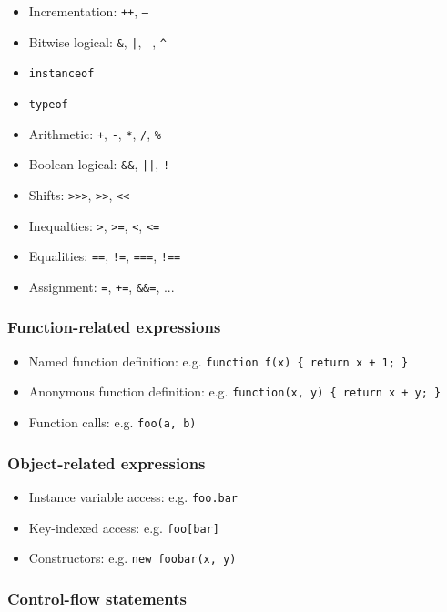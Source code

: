 \documentclass{article}
\begin{document}
\begin{multicols}{2}
\begin{itemize}
  \item Incrementation: \texttt{++}, \texttt{--}
  \item Bitwise logical: \texttt{\&}, \texttt{|}, \texttt{~}, \texttt{\^}
  \item \texttt{instanceof}
  \item \texttt{typeof}
  \item Arithmetic: \texttt{+}, \texttt{-}, \texttt{*}, \texttt{/}, \texttt{\%}
  \item Boolean logical: \texttt{\&\&}, \texttt{||}, \texttt{!}
  \item Shifts: \texttt{>>>}, \texttt{>>}, \texttt{<<}
  \item Inequalties: \texttt{>}, \texttt{>=}, \texttt{<}, \texttt{<=}
  \item Equalities: \texttt{==}, \texttt{!=}, \texttt{===}, \texttt{!==}
  \item Assignment: \texttt{=}, \texttt{+=}, \texttt{\&\&=}, ...
\end{itemize}

\subsubsection*{Function-related expressions}

\begin{itemize}
  \item Named function definition: e.g. \texttt{function f(x) \{ return x + 1; \} }
  \item Anonymous function definition: e.g. \texttt{function(x, y) \{ return x + y; \} }
  \item Function calls: e.g. \texttt{foo(a, b)}
\end{itemize}

\subsubsection*{Object-related expressions}

\begin{itemize}
  \item Instance variable access: e.g. \texttt{foo.bar}
  \item Key-indexed access: e.g. \texttt{foo[bar]}
  \item Constructors: e.g. \texttt{new foobar(x, y)}
\end{itemize}

\subsubsection*{Control-flow statements}


\end{multicols}
\end{document}

